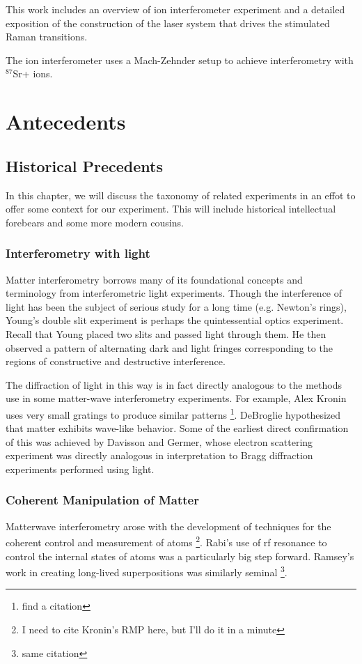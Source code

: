 

This work includes an overview of ion interferometer experiment and a detailed exposition of the construction of the laser system that drives the stimulated Raman transitions.

The ion interferometer uses a Mach-Zehnder setup to achieve interferometry with $^{87}$Sr+ ions.


\chapter{Antecedents}
\section{Historical Precedents}
In this chapter, we will discuss the taxonomy of related experiments in an effot to offer some context for our experiment. This will include historical intellectual forebears and some more modern cousins. 
 \subsection{Interferometry with light}
Matter interferometry borrows many of its foundational concepts and terminology from interferometric light experiments. Though the interference of light has been the subject of serious study for a long time (e.g. Newton's rings), Young's double slit experiment is perhaps the quintessential optics experiment. Recall that Young placed two slits and passed light through them. He then observed a pattern of alternating dark and light fringes corresponding to the regions of constructive and destructive interference. 

The diffraction of light in this way is in fact directly analogous to the methods use in some matter-wave interferometry experiments. For example, Alex Kronin uses very small gratings to produce similar patterns \footnote{find a citation}. 
DeBroglie hypothesized that matter exhibits wave-like behavior. Some of the earliest direct confirmation of this was achieved by Davisson and Germer, whose electron scattering experiment was directly analogous in interpretation to Bragg diffraction experiments performed using light. 
\subsection{Coherent Manipulation of Matter}
Matterwave interferometry arose with the development of techniques for the coherent control and measurement of atoms \footnote{I need to cite Kronin's RMP here, but I'll do it in a minute}. Rabi's use of rf resonance to control the internal states of atoms was a particularly big step forward. Ramsey's work in creating long-lived superpositions was similarly seminal \footnote{same citation}. 

